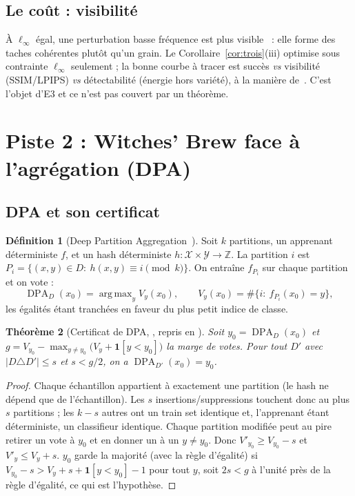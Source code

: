 \documentclass[11pt,a4paper]{article}
\theoremstyle{plain}
\newtheorem{theorem}{Théorème}[section]
\theoremstyle{definition}
\newtheorem{definition}[theorem]{Définition}
\theoremstyle{remark}
\DeclareMathOperator{\argmax}{arg\,max}
\DeclareMathOperator{\DPA}{DPA}
\begin{document}
\subsection{Le coût : visibilité}

À $\ell_\infty$ égal, une perturbation basse fréquence est plus visible~\cite{sharma2019} : elle
forme des taches cohérentes plutôt qu'un grain. Le Corollaire~\ref{cor:trois}(iii) optimise sous
contrainte $\ell_\infty$ seulement ; la bonne courbe à tracer est succès \emph{vs} visibilité
(SSIM/LPIPS) \emph{vs} détectabilité (énergie hors variété), à la manière de~\cite{lukas2023}.
C'est l'objet d'E3 et ce n'est pas couvert par un théorème.

\section{Piste 2 : Witches' Brew face à l'agrégation (DPA)}

\subsection{DPA et son certificat}

\begin{definition}[Deep Partition Aggregation~\cite{levine2021}]
Soit $k$ partitions, un apprenant déterministe $f$, et un hash déterministe $h:\mathcal X\times\mathcal Y\to\mathbb Z$.
La partition $i$ est $P_i=\{(x,y)\in D:\ h(x,y)\equiv i\pmod k\}$. On entraîne $f_{P_i}$ sur chaque
partition et on vote :
\[
\DPA_D(x_0)=\argmax_y V_y(x_0),\qquad V_y(x_0)=\#\{i:\ f_{P_i}(x_0)=y\},
\]
les égalités étant tranchées en faveur du plus petit indice de classe.
\end{definition}

\begin{theorem}[Certificat de DPA, {\cite[Thm.~1]{levine2021}}, repris en {\cite[Thm.~2.1]{wang2023}}]\label{thm:dpa}
Soit $y_0=\DPA_D(x_0)$ et $g=V_{y_0}-\max_{y\ne y_0}\big(V_y+\mathbf 1[y<y_0]\big)$ la marge de votes.
Pour tout $D'$ avec $|D\triangle D'|\le s$ et $s<g/2$, on a $\DPA_{D'}(x_0)=y_0$.
\end{theorem}
\begin{proof}
Chaque échantillon appartient à exactement une partition (le hash ne dépend que de l'échantillon).
Les $s$ insertions/suppressions touchent donc au plus $s$ partitions ; les $k-s$ autres ont un
train set identique et, l'apprenant étant déterministe, un classifieur identique. Chaque partition
modifiée peut au pire retirer un vote à $y_0$ et en donner un à un $y\ne y_0$. Donc
$V'_{y_0}\ge V_{y_0}-s$ et $V'_y\le V_y+s$. $y_0$ garde la majorité (avec la règle d'égalité) si
$V_{y_0}-s>V_y+s+\mathbf 1[y<y_0]-1$ pour tout $y$, soit $2s<g$ à l'unité près de la règle
d'égalité, ce qui est l'hypothèse.
\end{proof}
\end{document}
